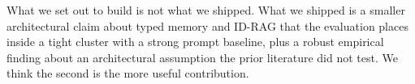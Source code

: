 What we set out to build is not what we shipped. What we shipped is a smaller architectural claim about typed memory and ID-RAG that the evaluation places inside a tight cluster with a strong prompt baseline, plus a robust empirical finding about an architectural assumption the prior literature did not test. We think the second is the more useful contribution.
